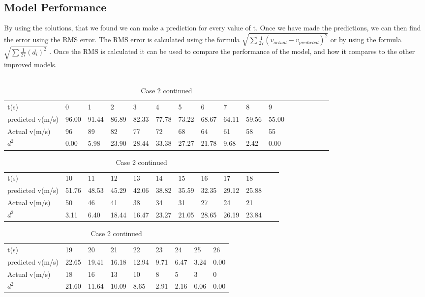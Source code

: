 \subsection{Model Performance}
By using the solutions, that we found we can make a prediction for every value of t. Once we have made the predictions, we can then find the error using the RMS error. The RMS error is calculated using the formula $\sqrt{\sum{\frac{1}{27}(v_{actual} - v_{predicted})^2}}$ or by using the formula $\sqrt{\sum{\frac{1}{27}(d_i)^2}}$ . Once the RMS is calculated it can be used to compare the performance of the model, and how it compares to the other improved models.
\\ \\
\begin{table}[H]
\centering
    \begin{tabular}{|l|l|l|l|l|l|l|l|l|l|l|l|l|l|l|l|l|}
        \hline
        t(s) & 0 & 1 & 2 & 3 & 4 & 5 & 6 & 7 & 8 & 9 \\ \cline{1-11} 
        predicted v(m/s) & 96.00 & 91.44 & 86.89 & 82.33 & 77.78 & 73.22 & 68.67 & 64.11 & 59.56 & 55.00\\ \cline{1-11}
        Actual v(m/s) & 96 & 89 & 82 & 77 & 72 & 68 & 64 & 61 & 58 & 55 \\ \cline{1-11}
        $d^2$ & 0.00 & 5.98 & 23.90 & 28.44 & 33.38 & 27.27 &	21.78 & 9.68 & 2.42 & 0.00 \\ \cline{1-11}
    \end{tabular}
    \caption{Case 1}
    \vspace{0.5cm}
    
    \begin{tabular}{|l|l|l|l|l|l|l|l|l|l|l|l|}
        \hline
        t(s) & 10 & 11 & 12 & 13 & 14 & 15 & 16 & 17 & 18 \\ \cline{1-10}
        predicted v(m/s) & 51.76 & 48.53 & 45.29 & 42.06 & 38.82 & 35.59 & 32.35 & 29.12 & 25.88 \\ \cline{1-10}
        Actual v(m/s) & 50 & 46 & 41 & 38 & 34 & 31 & 27 & 24 & 21 \\ \cline{1-10}
        $d^2$ & 3.11 & 6.40 & 18.44 & 16.47 & 23.27 & 21.05 & 28.65 & 26.19 & 23.84 \\ \cline{1-10}
    \end{tabular}
    \caption{Case 2}
    \vspace{0.5cm}
    
    \begin{tabular}{|l|l|l|l|l|l|l|l|l|}
        \hline
        t(s) & 19 & 20 & 21 & 22 & 23 & 24 & 25 & 26 \\ \cline{1-9}
        predicted v(m/s) & 22.65 & 19.41 & 16.18 & 12.94 & 9.71 & 6.47 & 3.24 & 0.00 \\ \cline{1-9}
        Actual v(m/s) & 18 & 16 & 13 & 10 & 8 & 5 & 3 & 0
        \\ \cline{1-9}
        $d^2$ & 21.60 & 11.64 & 10.09 & 8.65 & 2.91 & 2.16 & 0.06 & 0.00 \\ \cline{1-9}
    \end{tabular}
    \caption{Case 2 continued}
    \vspace{0.5cm}
\end{table}

